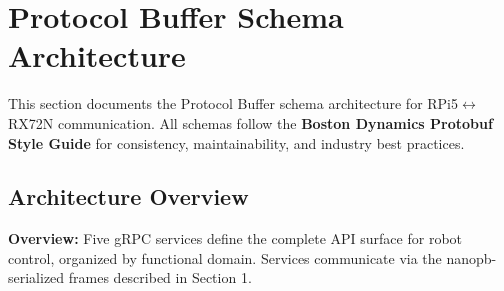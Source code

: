 
\newpage
\section{Protocol Buffer Schema Architecture}

This section documents the Protocol Buffer schema architecture for RPi5$\leftrightarrow$RX72N communication. All schemas follow the \textbf{Boston Dynamics Protobuf Style Guide
} for
  consistency, maintainability,
      and industry best practices.

\subsection{Architecture Overview
 }

\textbf{Overview:} Five gRPC services define the complete API surface for robot control, organized by functional domain. Services communicate via the nanopb-serialized frames described in Section 1.

